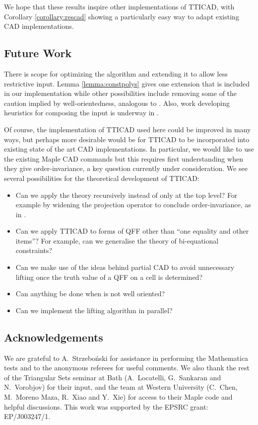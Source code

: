 \documentclass{article}
\begin{document}
We hope that these results inspire other implementations of TTICAD, with Corollary \ref{corollary:rescad} showing a particularly easy way to adapt existing CAD implementations.    

\subsection{Future Work}

There is scope for optimizing the algorithm and extending it to allow less restrictive input.  Lemma \ref{lemma:constpolys} gives one extension that is included in our implementation while other possibilities include removing some of the caution implied by well-orientedness, analogous to \cite{Brown2005}.  Also, work developing heuristics for composing the input is underway in \cite{BDEW13}.  

Of course, the implementation of TTICAD used here could be improved in many ways, but perhaps more desirable would be for TTICAD to be incorporated into existing state of the art CAD implementations.  In particular, we would like to use the existing {\sc Maple} CAD commands \cite{Chenetal2009d} but this requires first understanding when they give order-invariance, a key question currently under consideration.  
We see several possibilities for the theoretical development of TTICAD:
\begin{itemize}[itemsep=-4.5pt,topsep=-10pt]
\item Can we apply the theory recursively instead of only at the top level?  For example by widening the projection operator to 
conclude order-invariance, as in \cite{McCallum2001}.  
\item Can we apply TTICAD to forms of QFF other than ``one equality and other items''?
For example, can we generalise the theory of bi-equational constraints?
\item Can we make use of the ideas behind partial CAD to avoid unnecessary lifting once the truth value of a QFF on a cell is determined? 
\item Can anything be done when  is not well oriented?
\item Can we implement the lifting algorithm in parallel?
\end{itemize}

\subsection*{Acknowledgements}
We are grateful to A.~Strzebo\'nski for assistance in performing the Mathematica tests and to the anonymous referees for useful comments.  We also thank the rest of the Triangular Sets seminar at Bath (A.~Locatelli, G.~Sankaran and N.~Vorobjov) for their input, and the team at Western University (C.~Chen, M.~Moreno Maza, R.~Xiao and Y.~Xie) for access to their {\sc Maple} code and helpful discussions. This work was supported by the EPSRC grant: EP/J003247/1.




\end{document}
